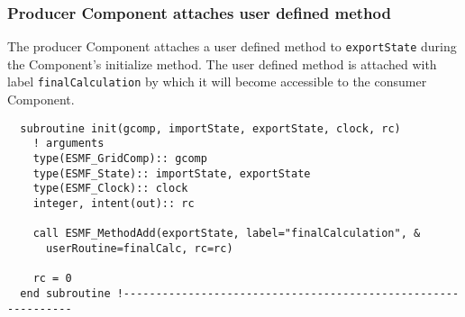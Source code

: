  
\setlength{\oldparskip}{\parskip}
\setlength{\parskip}{1.5ex}
\setlength{\oldparindent}{\parindent}
\setlength{\parindent}{0pt}
\setlength{\oldbaselineskip}{\baselineskip}
\setlength{\baselineskip}{11pt}
 
\def\bv{\begin{verbatim}}
\def\ev{\end{verbatim}}
\def\be{\begin{equation}}
\def\ee{\end{equation}}
\def\bea{\begin{eqnarray}}
\def\eea{\end{eqnarray}}
\def\bi{\begin{itemize}}
\def\ei{\end{itemize}}
\def\bn{\begin{enumerate}}
\def\en{\end{enumerate}}
\def\bd{\begin{description}}
\def\ed{\end{description}}
\def\({\left (}
\def\){\right )}
\def\[{\left [}
\def\]{\right ]}
\def\<{\left  \langle}
\def\>{\right \rangle}
\def\cI{{\cal I}}
\def\diag{\mathop{\rm diag}}
\def\tr{\mathop{\rm tr}}


 

  \subsubsection{Producer Component attaches user defined method}
        
    The producer Component attaches a user defined method to {\tt exportState}
    during the Component's initialize method. The user defined method is
    attached with label {\tt finalCalculation} by which it will become
    accessible to the consumer Component. 

 \begin{verbatim}
  subroutine init(gcomp, importState, exportState, clock, rc)
    ! arguments
    type(ESMF_GridComp):: gcomp
    type(ESMF_State):: importState, exportState
    type(ESMF_Clock):: clock
    integer, intent(out):: rc
    
    call ESMF_MethodAdd(exportState, label="finalCalculation", &
      userRoutine=finalCalc, rc=rc)

    rc = 0
  end subroutine !--------------------------------------------------------------
 
\end{verbatim}
 
